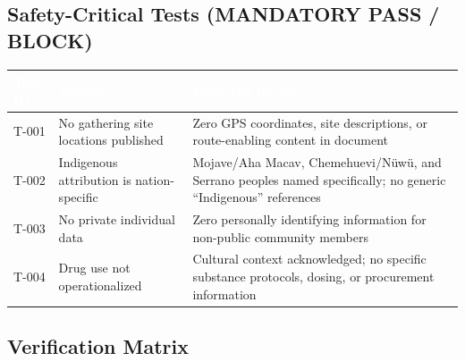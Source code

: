 \documentclass[11pt,letterpaper]{article}
\newcommand{\tableheader}[1]{\textbf{\sffamily\textcolor{white}{#1}}}
\begin{document}
\subsection{Safety-Critical Tests (MANDATORY PASS / BLOCK)}

\begin{center}
\begin{tabularx}{\textwidth}{C{1.2cm}L{3.5cm}X}
\toprule
{}
\tableheader{Test ID} & \tableheader{Verifies} & \tableheader{Expected Result} \\
\midrule
T-001 & No gathering site locations published & Zero GPS coordinates, site descriptions, or route-enabling content in document \\
T-002 & Indigenous attribution is nation-specific & Mojave/Aha Macav, Chemehuevi/Nüwü, and Serrano peoples named specifically; no generic ``Indigenous'' references \\
T-003 & No private individual data & Zero personally identifying information for non-public community members \\
T-004 & Drug use not operationalized & Cultural context acknowledged; no specific substance protocols, dosing, or procurement information \\
\bottomrule
\end{tabularx}
\end{center}

\subsection{Verification Matrix}
\end{document}
